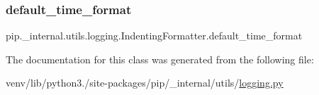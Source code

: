 \subsubsection{\texorpdfstring{default\+\_\+time\+\_\+format}{default\_time\_format}}
{\footnotesize\ttfamily pip.\+\_\+internal.\+utils.\+logging.\+Indenting\+Formatter.\+default\+\_\+time\+\_\+format\hspace{0.3cm}{\ttfamily [static]}}



The documentation for this class was generated from the following file\+:\begin{DoxyCompactItemize}
\item 
venv/lib/python3./site-\/packages/pip/\+\_\+internal/utils/\hyperlink{logging_8py}{logging.\+py}\end{DoxyCompactItemize}

